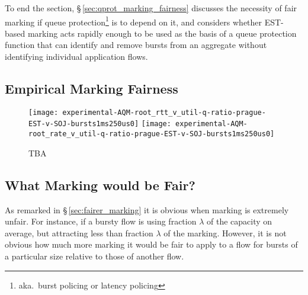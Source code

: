 To end the section, \S\,\ref{sec:qprot_marking_fairness} discusses the necessity of fair marking if queue protection\footnote{aka.\ burst policing or latency policing} is to depend on it, and considers whether EST-based marking acts rapidly enough to be used as the basis of a queue protection function that can identify and remove bursts from an aggregate without identifying individual application flows.

\subsection{Empirical Marking Fairness}\label{sec:marking_fairness_expts}


\begin{figure*}
	\centering
	\texttt{[image: experimental-AQM-root\_rtt\_v\_util-q-ratio-prague-EST-v-SOJ-bursts1ms250us0]}
	\texttt{[image: experimental-AQM-root\_rate\_v\_util-q-ratio-prague-EST-v-SOJ-bursts1ms250us0]}
	\caption{TBA}
\end{figure*}

\subsection{What Marking would be Fair?}\label{sec:marking_fairness_definition}

As remarked in \S\,\ref{sec:fairer_marking} it is obvious when marking is extremely unfair. For instance, if a bursty flow is using fraction \(\lambda\) of the capacity on average, but attracting less than fraction \(\lambda\) of the marking. However, it is not obvious how much more marking it would be fair to apply to a flow for bursts of a particular size relative to those of another flow.

